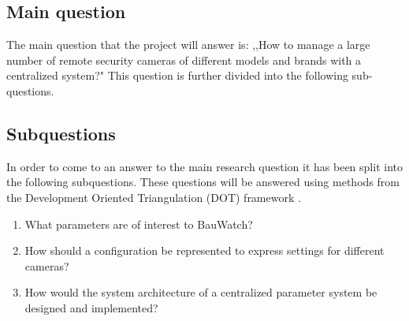 
\subsection{Main question}
The main question that the project will answer is: ,,How to manage a large number of remote security cameras of different models and brands with a centralized system?"
This question is further divided into the following sub-questions.

\subsection{Subquestions}
In order to come to an answer to the main research question it has been split into the following subquestions.
These questions will be answered using methods from the Development Oriented Triangulation (DOT) framework \cite{dot_framework}.
\begin{enumerate}
	\item What parameters are of interest to BauWatch?
	\item How should a configuration be represented to express settings for different cameras?
	\item How would the system architecture of a centralized parameter system be designed and implemented?
\end{enumerate}

